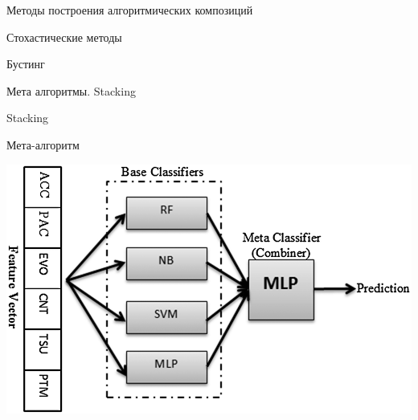 \documentclass[10pt]{beamer}
\begin{document}
\begin{frame}{Методы построения алгоритмических композиций}
\begin{block}{Стохастические методы}
\end{block}
\begin{block}{Бустинг}
\end{block}
\begin{block}{Мета алгоритмы. Stacking}
\end{block}
\end{frame}

\begin{frame}{Stacking}
\begin{block}{Мета-алгоритм}
\end{block}
\begin{center}
    \includegraphics[scale=0.3]{images/stacking.png}
\end{center}
\end{frame}
\end{document}
